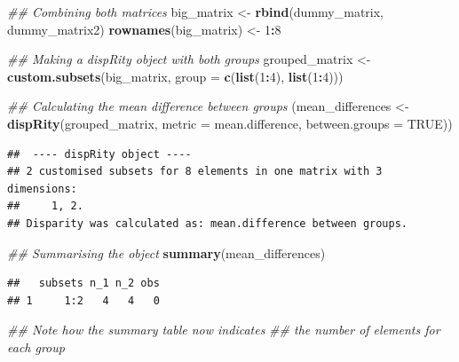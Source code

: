 \documentclass[]{book}
\newenvironment{Shaded}{\begin{snugshade}}{\end{snugshade}}
\newcommand{\CommentTok}[1]{\textcolor[rgb]{0.56,0.35,0.01}{\textit{#1}}}
\newcommand{\DataTypeTok}[1]{\textcolor[rgb]{0.13,0.29,0.53}{#1}}
\newcommand{\DecValTok}[1]{\textcolor[rgb]{0.00,0.00,0.81}{#1}}
\newcommand{\KeywordTok}[1]{\textcolor[rgb]{0.13,0.29,0.53}{\textbf{#1}}}
\newcommand{\NormalTok}[1]{#1}
\newcommand{\OperatorTok}[1]{\textcolor[rgb]{0.81,0.36,0.00}{\textbf{#1}}}
\newcommand{\OtherTok}[1]{\textcolor[rgb]{0.56,0.35,0.01}{#1}}
\newcommand{\StringTok}[1]{\textcolor[rgb]{0.31,0.60,0.02}{#1}}
\begin{document}
\begin{Shaded}
\begin{Highlighting}[]
\CommentTok{## Combining both matrices}
\NormalTok{big_matrix <-}\StringTok{ }\KeywordTok{rbind}\NormalTok{(dummy_matrix, dummy_matrix2)}
\KeywordTok{rownames}\NormalTok{(big_matrix) <-}\StringTok{ }\DecValTok{1}\OperatorTok{:}\DecValTok{8}

\CommentTok{## Making a dispRity object with both groups}
\NormalTok{grouped_matrix <-}\StringTok{ }\KeywordTok{custom.subsets}\NormalTok{(big_matrix,}
                                 \DataTypeTok{group =} \KeywordTok{c}\NormalTok{(}\KeywordTok{list}\NormalTok{(}\DecValTok{1}\OperatorTok{:}\DecValTok{4}\NormalTok{), }\KeywordTok{list}\NormalTok{(}\DecValTok{1}\OperatorTok{:}\DecValTok{4}\NormalTok{)))}

\CommentTok{## Calculating the mean difference between groups}
\NormalTok{(mean_differences <-}\StringTok{ }\KeywordTok{dispRity}\NormalTok{(grouped_matrix,}
                              \DataTypeTok{metric =}\NormalTok{ mean.difference,}
                              \DataTypeTok{between.groups =} \OtherTok{TRUE}\NormalTok{))}
\end{Highlighting}
\end{Shaded}

\begin{verbatim}
##  ---- dispRity object ---- 
## 2 customised subsets for 8 elements in one matrix with 3 dimensions:
##     1, 2.
## Disparity was calculated as: mean.difference between groups.
\end{verbatim}

\begin{Shaded}
\begin{Highlighting}[]
\CommentTok{## Summarising the object}
\KeywordTok{summary}\NormalTok{(mean_differences)}
\end{Highlighting}
\end{Shaded}

\begin{verbatim}
##   subsets n_1 n_2 obs
## 1     1:2   4   4   0
\end{verbatim}

\begin{Shaded}
\begin{Highlighting}[]
\CommentTok{## Note how the summary table now indicates}
\CommentTok{## the number of elements for each group}
\end{Highlighting}
\end{Shaded}
\end{document}
